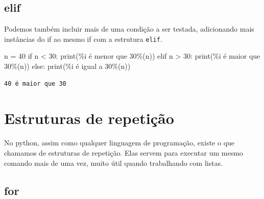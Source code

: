 \documentclass[
  letterpaper,
  DIV=11,
  numbers=noendperiod]{scrreprt}
\newenvironment{Shaded}{\begin{snugshade}}{\end{snugshade}}
\newcommand{\BuiltInTok}[1]{\textcolor[rgb]{0.00,0.23,0.31}{#1}}
\newcommand{\ControlFlowTok}[1]{\textcolor[rgb]{0.00,0.23,0.31}{#1}}
\newcommand{\DecValTok}[1]{\textcolor[rgb]{0.68,0.00,0.00}{#1}}
\newcommand{\NormalTok}[1]{\textcolor[rgb]{0.00,0.23,0.31}{#1}}
\newcommand{\OperatorTok}[1]{\textcolor[rgb]{0.37,0.37,0.37}{#1}}
\newcommand{\SpecialCharTok}[1]{\textcolor[rgb]{0.37,0.37,0.37}{#1}}
\newcommand{\StringTok}[1]{\textcolor[rgb]{0.13,0.47,0.30}{#1}}
\begin{document}
\hypertarget{elif}{%
\section{elif}\label{elif}}

Podemos também incluir mais de uma condição a ser testada, adicionando
mais instâncias do if ao mesmo if com a estrutura \texttt{elif}.

\begin{Shaded}
\begin{Highlighting}[]
\NormalTok{n }\OperatorTok{=} \DecValTok{40}
\ControlFlowTok{if}\NormalTok{ n }\OperatorTok{\textless{}} \DecValTok{30}\NormalTok{:}
    \BuiltInTok{print}\NormalTok{(}\StringTok{\textquotesingle{}}\SpecialCharTok{\%i}\StringTok{ é menor que 30\textquotesingle{}}\OperatorTok{\%}\NormalTok{(n))}
\ControlFlowTok{elif}\NormalTok{ n }\OperatorTok{\textgreater{}} \DecValTok{30}\NormalTok{:}
    \BuiltInTok{print}\NormalTok{(}\StringTok{\textquotesingle{}}\SpecialCharTok{\%i}\StringTok{ é maior que 30\textquotesingle{}}\OperatorTok{\%}\NormalTok{(n))}
\ControlFlowTok{else}\NormalTok{:}
    \BuiltInTok{print}\NormalTok{(}\StringTok{\textquotesingle{}}\SpecialCharTok{\%i}\StringTok{ é igual a 30\textquotesingle{}}\OperatorTok{\%}\NormalTok{(n))}
\end{Highlighting}
\end{Shaded}

\begin{tcolorbox}[enhanced jigsaw, breakable, leftrule=.75mm, left=2mm, opacityback=0, bottomrule=.15mm, toprule=.15mm, rightrule=.15mm, arc=.35mm, colback=white]

\begin{verbatim}
40 é maior que 30
\end{verbatim}

\end{tcolorbox}


\hypertarget{estruturas-de-repetiuxe7uxe3o}{%
\chapter{Estruturas de repetição}\label{estruturas-de-repetiuxe7uxe3o}}

No python, assim como qualquer linguagem de programação, existe o que
chamamos de estruturas de repetição. Elas servem para executar um mesmo
comando mais de uma vez, muito útil quando trabalhando com listas.

\hypertarget{for}{%
\section{for}\label{for}}
\end{document}
